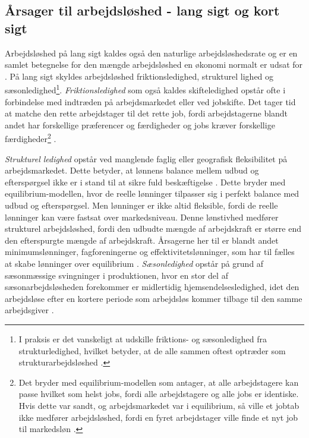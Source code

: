 \subsection{Årsager til arbejdsløshed - lang sigt og kort sigt}

Arbejdsløshed på lang sigt kaldes også den naturlige arbejdsløshedsrate og er en samlet betegnelse for den mængde arbejdsløshed en økonomi normalt er udsat for \parencite[592]{Mankiw2011}. På lang sigt skyldes arbejdsløshed friktionsledighed, strukturel lighed og sæsonledighed\footnote{I praksis er det vanskeligt at udskille friktions- og sæsonledighed fra strukturledighed, hvilket betyder, at de alle sammen oftest optræder som strukturarbejdsløshed \parencite{2015}.}. %
\textit{Friktionsledighed} som også kaldes skifteledighed opstår ofte i forbindelse med indtræden på arbejdsmarkedet eller ved jobskifte. Det tager tid at matche den rette arbejdstager til det rette job, fordi arbejdstagerne blandt andet har forskellige præferencer og færdigheder og jobs kræver forskellige færdigheder\footnote{Det bryder med equilibrium-modellen som antager, at alle arbejdstagere kan passe hvilket som helst jobs, fordi alle arbejdstagere og alle jobs er identiske. Hvis dette var sandt, og arbejdsmarkedet var i equilibrium, så ville et jobtab ikke medfører arbejdsløshed, fordi en fyret arbejdstager ville finde et nyt job til markedsløn \parencite[163]{Mankiw2007}.} \parencite[163]{Mankiw2007}. %

\textit{Strukturel ledighed} opstår ved manglende faglig eller geografisk fleksibilitet på arbejdsmarkedet. Dette betyder, at lønnens balance mellem udbud og efterspørgsel ikke er i stand til at sikre fuld beskæftigelse \parencite[600]{Mankiw2011}. %
Dette bryder med equilibrium-modellen, hvor de reelle lønninger tilpasser sig i perfekt balance med udbud og efterspørgsel. Men lønninger er ikke altid fleksible, fordi de reelle lønninger kan være fastsat over markedsniveau. Denne lønstivhed medfører strukturel arbejdsløshed, fordi den udbudte mængde af arbejdskraft er større end den efterspurgte mængde af arbejdskraft. Årsagerne her til er blandt andet minimumslønninger, fagforeningerne og effektivitetslønninger, som har til fælles at skabe lønninger over equilibrium \parencite[165]{Mankiw2007}.
\textit{Sæsonledighed} opstår på grund af sæsonmæssige svingninger i produktionen, hvor en stor del af sæsonarbejdsløsheden forekommer er midlertidig hjemsendelsesledighed, idet den arbejdsløse efter en kortere periode som arbejdsløs kommer tilbage til den samme arbejdsgiver \parencite{2015}.

